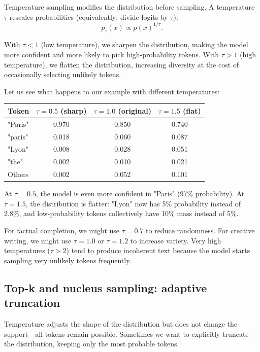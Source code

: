 Temperature sampling modifies the distribution before sampling. A temperature $\tau$ rescales probabilities (equivalently: divide logits by $\tau$):
\begin{equation}
p_\tau(x) \propto p(x)^{1/\tau}.
\end{equation}

With $\tau < 1$ (low temperature), we sharpen the distribution, making the model more confident and more likely to pick high-probability tokens. With $\tau > 1$ (high temperature), we flatten the distribution, increasing diversity at the cost of occasionally selecting unlikely tokens.

Let us see what happens to our example with different temperatures:

\begin{center}
\begin{tabular}{lccc}
\toprule
\textbf{Token} & $\tau=0.5$ (sharp) & $\tau=1.0$ (original) & $\tau=1.5$ (flat) \\
\midrule
"Paris" & 0.970 & 0.850 & 0.740 \\
"paris" & 0.018 & 0.060 & 0.087 \\
"Lyon" & 0.008 & 0.028 & 0.051 \\
"the" & 0.002 & 0.010 & 0.021 \\
Others & 0.002 & 0.052 & 0.101 \\
\bottomrule
\end{tabular}
\end{center}

At $\tau=0.5$, the model is even more confident in "Paris" (97\% probability). At $\tau=1.5$, the distribution is flatter: "Lyon" now has 5\% probability instead of 2.8\%, and low-probability tokens collectively have 10\% mass instead of 5\%.

For factual completion, we might use $\tau=0.7$ to reduce randomness. For creative writing, we might use $\tau=1.0$ or $\tau=1.2$ to increase variety. Very high temperatures ($\tau>2$) tend to produce incoherent text because the model starts sampling very unlikely tokens frequently.

\subsection{Top-k and nucleus sampling: adaptive truncation}
\label{sec:topk_nucleus}

Temperature adjusts the shape of the distribution but does not change the support---all tokens remain possible. Sometimes we want to explicitly truncate the distribution, keeping only the most probable tokens.

